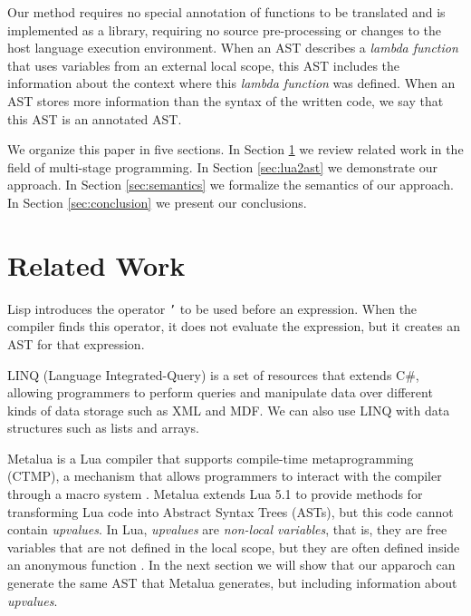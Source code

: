 \documentclass[english]{llncs}
\begin{document}
Our method requires no special annotation of functions to be translated and is
implemented as a library, requiring no source pre-processing or changes to
the host language execution environment.
When an AST describes a \emph{lambda function} that uses variables from an
external local scope, this AST includes the information about the context
where this \emph{lambda function} was defined.
When an AST stores more information than the syntax of the written code,
we say that this AST is an annotated AST.

We organize this paper in five sections.
In Section \ref{sec:related} we review related work in the field
of multi-stage programming.
In Section \ref{sec:lua2ast} we demonstrate our approach.
In Section \ref{sec:semantics} we formalize the semantics of our approach.
In Section \ref{sec:conclusion} we present our conclusions.

\section{Related Work}
\label{sec:related}

Lisp \cite{McCarthy1960RFS} introduces the operator \texttt{'}
to be used before an expression.
When the compiler finds this operator, it does not evaluate the expression,
but it creates an AST for that expression.

LINQ (Language Integrated-Query) \cite{linq} is a set of resources that
extends C\#, allowing programmers to perform queries and manipulate data over
different kinds of data storage such as XML and MDF.
We can also use LINQ with data structures such as lists and arrays.

\cite{Calcagno2003implementing}

\cite{Taha2004gentle,Taha2008gentle}

\cite{Taha2000MetaML}

\cite{Taha1999MSP}

\cite{Westbrook2010Mint}

Metalua \cite{metalua} is a Lua compiler that supports compile-time
metaprogramming (CTMP), a mechanism that allows programmers to interact
with the compiler through a macro system \cite{Fleutot2007contrasting}.
Metalua extends Lua 5.1 to provide methods for transforming Lua
code into Abstract Syntax Trees (ASTs), but this code cannot contain
\emph{upvalues}.
In Lua, \emph{upvalues} are \emph{non-local variables}, that is,
they are free variables that are not defined in the local scope,
but they are often defined inside an anonymous function \cite{Ierusalimschy2006PIL}.
In the next section we will show that our apparoch can generate
the same AST that Metalua generates, but including information
about \emph{upvalues}.
\end{document}

